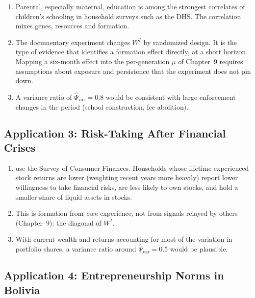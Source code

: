 \documentclass[../structural_economics_book.tex]{subfiles}
\begin{document}
\begin{stylizedfact}\label{ch11:prop:education}
\leavevmode
\begin{enumerate}
\item Parental, especially maternal, education is among the strongest correlates of children's schooling in household surveys such as the DHS. The correlation mixes genes, resources and formation.
\item The \citet{bernard2014future} documentary experiment changes $W^I$ by randomized design. It is the type of evidence that identifies a formation effect directly, at a short horizon. Mapping a six-month effect into the per-generation $\mu$ of Chapter~9 requires assumptions about exposure and persistence that the experiment does not pin down.
\item \textup{\illustrative} A variance ratio of $\hat{\Psi}_{\text{var}} = 0.8$ would be consistent with large enforcement changes in the period (school construction, fee abolition).
\end{enumerate}
\end{stylizedfact}


\subsection{Application 3: Risk-Taking After Financial Crises}

\begin{stylizedfact}\label{ch11:prop:risk}
\leavevmode
\begin{enumerate}
\item \citet[\textit{QJE}]{malmendier2011depression} use the Survey of Consumer Finances. Households whose lifetime experienced stock returns are lower (weighting recent years more heavily) report lower willingness to take financial risks, are less likely to own stocks, and hold a smaller share of liquid assets in stocks.
\item This is formation from \textit{own} experience, not from signals relayed by others (Chapter~9): the diagonal of $W^I$.
\item \textup{\illustrative} With current wealth and returns accounting for most of the variation in portfolio shares, a variance ratio around $\hat{\Psi}_{\text{var}} = 0.5$ would be plausible.
\end{enumerate}
\end{stylizedfact}


\subsection{Application 4: Entrepreneurship Norms in Bolivia}
\end{document}
